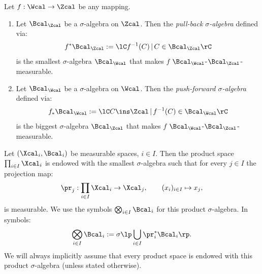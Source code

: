 \begin{DefLem}
    \label{sigma-algebra-map}
    Let $f: \Wcal \to \Zcal$ be any mapping.
    \begin{enumerate}
        \item Let $\Bcal_\Zcal$ be a $\sigma$-algebra on $\Zcal$. Then the \emph{pull-back $\sigma$-algebra} defined via:
            \[ f^*\Bcal_\Zcal := \lC f^{-1}(C)\,|\, C \in \Bcal_\Zcal   \rC \]
            is the smallest $\sigma$-algebra $\Bcal_\Wcal$ that makes $f$ $\Bcal_\Wcal$-$\Bcal_\Zcal$-measurable.
        \item Let $\Bcal_\Wcal$ be a $\sigma$-algebra on $\Wcal$. Then the \emph{push-forward $\sigma$-algebra} defined via:
            \[ f_*\Bcal_\Wcal := \lC C \ins \Zcal\,|\, f^{-1}(C) \in \Bcal_\Wcal   \rC \]
            is the biggest $\sigma$-algebra $\Bcal_\Zcal$ that makes $f$ $\Bcal_\Wcal$-$\Bcal_\Zcal$-measurable.
    \end{enumerate}
\end{DefLem}


\begin{Def}
    Let $(\Xcal_i,\Bcal_i)$ be measurable spaces, $i \in I$.
    Then the product space $\prod_{i \in I} \Xcal_i$ is endowed with the smallest $\sigma$-algebra
    such that for every $j\in I$ the projection map:
    \[ \pr_j: \prod_{i \in I} \Xcal_i \to \Xcal_j,\qquad (x_i)_{i \in I} \mapsto x_j, \]
    is measurable. We use the symbols $\bigotimes_{i \in I} \Bcal_i$ for this product $\sigma$-algebra.
    In symbols:
    \[ \bigotimes_{i \in I} \Bcal_i := \sigma\lp \bigcup_{i \in I} \pr_i^*\Bcal_i\rp. \]
  We will always implicitly assume that every product space is endowed with this product $\sigma$-algebra (unless stated otherwise).
\end{Def}



